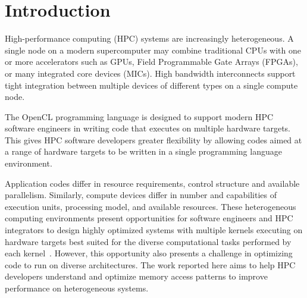 \documentclass[review=false, sigchi]{acmart}
\begin{document}
	\maketitle	
	
	\section{Introduction}
	
	High-performance computing (HPC) systems are increasingly heterogeneous.
	A single node on a modern supercomputer may combine traditional CPUs with one or more accelerators such as GPUs, Field Programmable Gate Arrays (FPGAs), or many integrated core devices (MICs).
	High bandwidth interconnects support tight integration between multiple devices of different types on a single compute node.
	
	The OpenCL programming language is designed to support modern HPC software engineers in writing code that executes on multiple hardware targets. 
	This gives HPC software developers greater flexibility by allowing codes aimed at a range of hardware targets to be written in a single programming language environment.
	
	Application codes differ in resource requirements, control structure and available parallelism. Similarly, compute devices differ in number and capabilities of execution units, processing model, and available resources.
	These heterogeneous computing environments present opportunities for software engineers and HPC integrators to design highly optimized systems with multiple kernels executing on hardware targets best suited for the diverse computational tasks performed by each kernel~\cite{spafford2010maestro}.
	However, this opportunity also presents a challenge in optimizing code to run on diverse architectures.
	The work reported here aims to help HPC developers understand and optimize memory access patterns to improve performance on heterogeneous systems.
	
\end{document}
